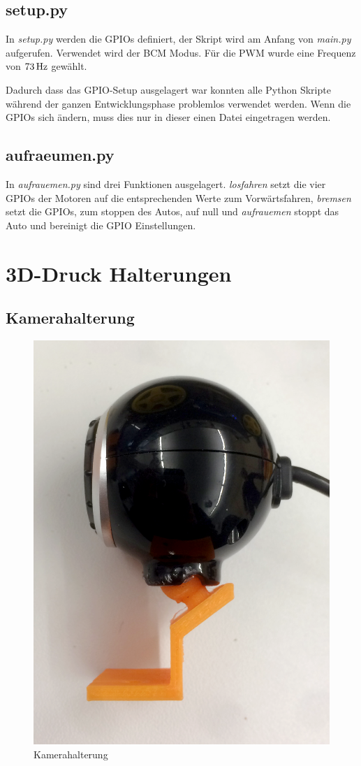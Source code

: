 \documentclass[a4paper, 12pt]{scrartcl}
\begin{document}
\newpage
\subsection{setup.py}	%


In \textit{setup.py} werden die GPIOs definiert, der Skript wird am Anfang von \textit{main.py} aufgerufen. Verwendet wird der BCM Modus. Für die PWM wurde eine Frequenz von $\unit[73]{Hz}$ gewählt.

Dadurch dass das GPIO-Setup ausgelagert war konnten alle Python Skripte während der ganzen Entwicklungsphase problemlos verwendet werden. Wenn die GPIOs sich ändern, muss dies nur in dieser einen Datei eingetragen werden.

\newpage
\subsection{aufraeumen.py}	%


In \textit{aufrauemen.py} sind drei Funktionen ausgelagert. \textit{losfahren} setzt die vier GPIOs der Motoren auf die entsprechenden Werte zum Vorwärtsfahren, \textit{bremsen} setzt die GPIOs, zum stoppen des Autos, auf null und \textit{aufrauemen} stoppt das Auto und bereinigt die GPIO Einstellungen.


\newpage
\section{3D-Druck Halterungen}

\subsection{Kamerahalterung}
\begin{figure}[ht!] \centering
	\includegraphics[width=.3\textwidth]{../bilder_videos/Kamerahalterung.png}
	\caption{Kamerahalterung}
	\label{kamerahalterung}
\end{figure}
\end{document}
